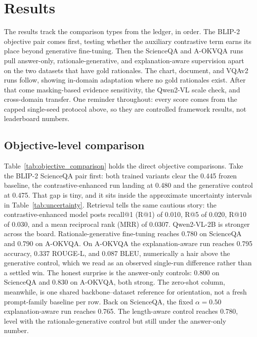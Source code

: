 \documentclass[preprint,12pt]{elsarticle}
\begin{document}
\section{Results}
The results track the comparison types from the ledger, in order.
The BLIP-2 objective pair comes first, testing whether the auxiliary contrastive term earns its place beyond generative fine-tuning.
Then the ScienceQA and A-OKVQA runs pull answer-only, rationale-generative, and explanation-aware supervision apart on the two datasets that have gold rationales.
The chart, document, and VQAv2 runs follow, showing in-domain adaptation where no gold rationales exist.
After that come masking-based evidence sensitivity, the Qwen2-VL scale check, and cross-domain transfer.
One reminder throughout: every score comes from the capped single-seed protocol above, so they are controlled framework results, not leaderboard numbers.

\subsection{Objective-level comparison}
Table~\ref{tab:objective_comparison} holds the direct objective comparisons.
Take the BLIP-2 ScienceQA pair first: both trained variants clear the 0.445 frozen baseline, the contrastive-enhanced run landing at 0.480 and the generative control at 0.475.
That gap is tiny, and it sits inside the approximate uncertainty intervals in Table~\ref{tab:uncertainty}.
Retrieval tells the same cautious story: the contrastive-enhanced model posts recall@1 (R@1) of 0.010, R@5 of 0.020, R@10 of 0.030, and a mean reciprocal rank (MRR) of 0.0307.
Qwen2-VL-2B is stronger across the board.
Rationale-generative fine-tuning reaches 0.780 on ScienceQA and 0.790 on A-OKVQA.
On A-OKVQA the explanation-aware run reaches 0.795 accuracy, 0.337 ROUGE-L, and 0.087 BLEU, numerically a hair above the generative control, which we read as an observed single-run difference rather than a settled win.
The honest surprise is the answer-only controls: 0.800 on ScienceQA and 0.830 on A-OKVQA, both strong.
The zero-shot column, meanwhile, is one shared backbone--dataset reference for orientation, not a fresh prompt-family baseline per row.
Back on ScienceQA, the fixed $\alpha=0.50$ explanation-aware run reaches 0.765.
The length-aware control reaches 0.780, level with the rationale-generative control but still under the answer-only number.
\end{document}
